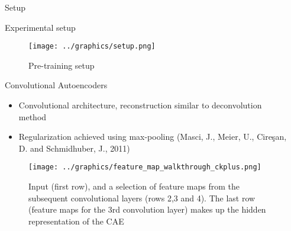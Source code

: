 \documentclass[final]{beamer}
\newlength{\sepwid}
\newlength{\onecolwid}
\begin{document}
\begin{frame}[t] %

\begin{columns}[t] %

\begin{column}{\sepwid}\end{column} %

\begin{column}{\onecolwid} %


\begin{alertblock}{Setup}

\begin{block}{Experimental setup}

\begin{figure}
\texttt{[image: ../graphics/setup.png]}
\caption{Pre-training setup}
\end{figure}

\end{block}

\begin{block}{Convolutional Autoencoders}

\begin{itemize}
	\item Convolutional architecture, reconstruction similar to deconvolution method 
	\item Regularization achieved using max-pooling (Masci, J., Meier, U., Cireşan, D. and Schmidhuber, J., 2011)
\end{itemize}

\begin{figure}

\captionsetup{format=default}

\texttt{[image: ../graphics/feature\_map\_walkthrough\_ckplus.png]}
\caption{Input (first row), and a selection of feature maps from the subsequent convolutional layers (rows 2,3 and 4). The last row (feature maps for the 3rd convolution layer) makes up the hidden representation of the CAE}
\end{figure}


\end{block}
\end{alertblock}
\end{column}
\end{columns}
\end{frame}
\end{document}
